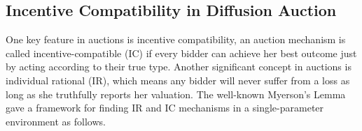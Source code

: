\documentclass{article}
\begin{document}
\subsection{Incentive Compatibility in Diffusion Auction}
 One key feature in auctions is incentive compatibility, an auction mechanism is called incentive-compatible (IC) if every bidder can achieve her best outcome just by acting according to their true type. Another significant concept in auctions is individual rational (IR), which means any bidder will never suffer from a loss as long as she truthfully reports her valuation. The well-known Myerson's Lemma \cite{myerson1981optimal} gave a framework for finding IR and IC mechanisms in a single-parameter environment as follows. 
\end{document}

